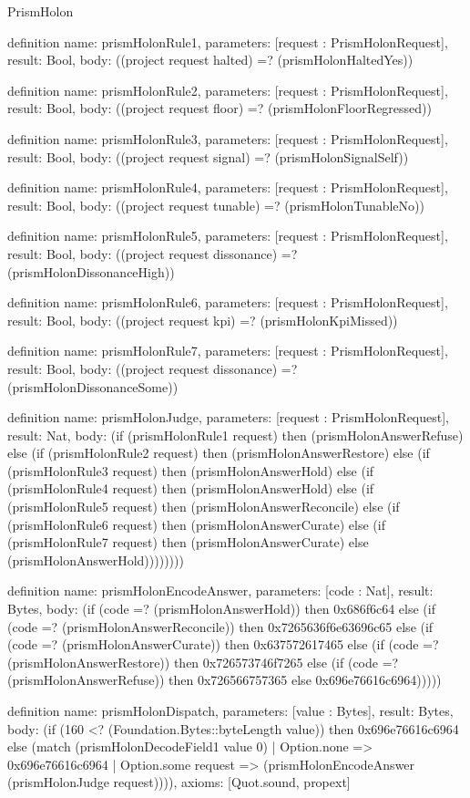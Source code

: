 \begin{lexlean}{PrismHolon}
\begin{semanticmodule}
definition{
  name: prismHolonRule1,
  parameters: [request : PrismHolonRequest],
  result: Bool,
  body: ((project request halted) =? (prismHolonHaltedYes))
}

definition{
  name: prismHolonRule2,
  parameters: [request : PrismHolonRequest],
  result: Bool,
  body: ((project request floor) =? (prismHolonFloorRegressed))
}

definition{
  name: prismHolonRule3,
  parameters: [request : PrismHolonRequest],
  result: Bool,
  body: ((project request signal) =? (prismHolonSignalSelf))
}

definition{
  name: prismHolonRule4,
  parameters: [request : PrismHolonRequest],
  result: Bool,
  body: ((project request tunable) =? (prismHolonTunableNo))
}

definition{
  name: prismHolonRule5,
  parameters: [request : PrismHolonRequest],
  result: Bool,
  body: ((project request dissonance) =? (prismHolonDissonanceHigh))
}

definition{
  name: prismHolonRule6,
  parameters: [request : PrismHolonRequest],
  result: Bool,
  body: ((project request kpi) =? (prismHolonKpiMissed))
}

definition{
  name: prismHolonRule7,
  parameters: [request : PrismHolonRequest],
  result: Bool,
  body: ((project request dissonance) =? (prismHolonDissonanceSome))
}

definition{
  name: prismHolonJudge,
  parameters: [request : PrismHolonRequest],
  result: Nat,
  body: (if (prismHolonRule1 request) then (prismHolonAnswerRefuse) else (if (prismHolonRule2 request) then (prismHolonAnswerRestore) else (if (prismHolonRule3 request) then (prismHolonAnswerHold) else (if (prismHolonRule4 request) then (prismHolonAnswerHold) else (if (prismHolonRule5 request) then (prismHolonAnswerReconcile) else (if (prismHolonRule6 request) then (prismHolonAnswerCurate) else (if (prismHolonRule7 request) then (prismHolonAnswerCurate) else (prismHolonAnswerHold))))))))
}

definition{
  name: prismHolonEncodeAnswer,
  parameters: [code : Nat],
  result: Bytes,
  body: (if (code =? (prismHolonAnswerHold)) then 0x686f6c64 else (if (code =? (prismHolonAnswerReconcile)) then 0x7265636f6e63696c65 else (if (code =? (prismHolonAnswerCurate)) then 0x637572617465 else (if (code =? (prismHolonAnswerRestore)) then 0x726573746f7265 else (if (code =? (prismHolonAnswerRefuse)) then 0x726566757365 else 0x696e76616c6964)))))
}

definition{
  name: prismHolonDispatch,
  parameters: [value : Bytes],
  result: Bytes,
  body: (if (160 <? (Foundation.Bytes::byteLength value)) then 0x696e76616c6964 else (match (prismHolonDecodeField1 value 0)
    | Option.none => 0x696e76616c6964
    | Option.some request => (prismHolonEncodeAnswer (prismHolonJudge request)))),
  axioms: [Quot.sound, propext]
}
\end{semanticmodule}
\end{lexlean}
